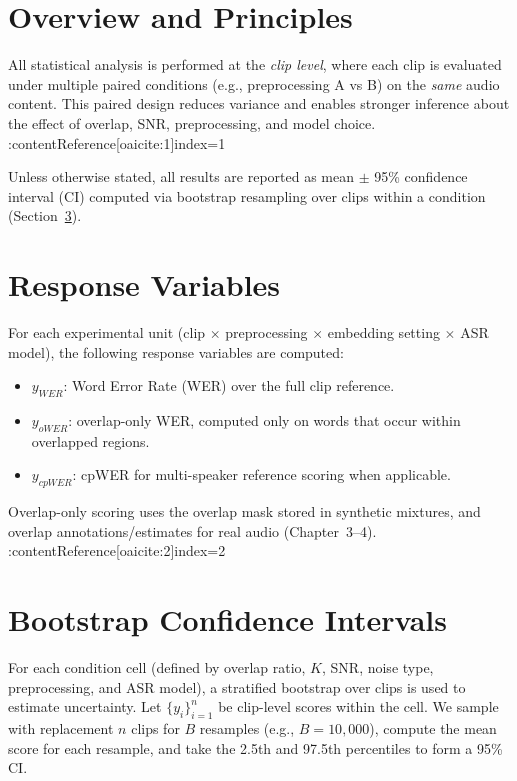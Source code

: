 \section{Overview and Principles}
All statistical analysis is performed at the \emph{clip level}, where each clip is evaluated under
multiple paired conditions (e.g., preprocessing A vs B) on the \emph{same} audio content. This
paired design reduces variance and enables stronger inference about the effect of overlap, SNR,
preprocessing, and model choice. :contentReference[oaicite:1]{index=1}

Unless otherwise stated, all results are reported as mean $\pm$ 95\% confidence interval (CI)
computed via bootstrap resampling over clips within a condition (Section~\ref{sec:bootstrap_ci}).

\section{Response Variables}
For each experimental unit (clip $\times$ preprocessing $\times$ embedding setting $\times$ ASR model),
the following response variables are computed:
\begin{itemize}
  \item $y_{WER}$: Word Error Rate (WER) over the full clip reference.
  \item $y_{oWER}$: overlap-only WER, computed only on words that occur within overlapped regions.
  \item $y_{cpWER}$: cpWER for multi-speaker reference scoring when applicable.
\end{itemize}
Overlap-only scoring uses the overlap mask stored in synthetic mixtures, and overlap annotations/estimates
for real audio (Chapter~3--4). :contentReference[oaicite:2]{index=2}

\section{Bootstrap Confidence Intervals}
\label{sec:bootstrap_ci}
For each condition cell (defined by overlap ratio, $K$, SNR, noise type, preprocessing, and ASR model),
a stratified bootstrap over clips is used to estimate uncertainty. Let $\{y_i\}_{i=1}^n$ be clip-level
scores within the cell. We sample with replacement $n$ clips for $B$ resamples (e.g., $B=10{,}000$),
compute the mean score for each resample, and take the 2.5th and 97.5th percentiles to form a 95\% CI.

